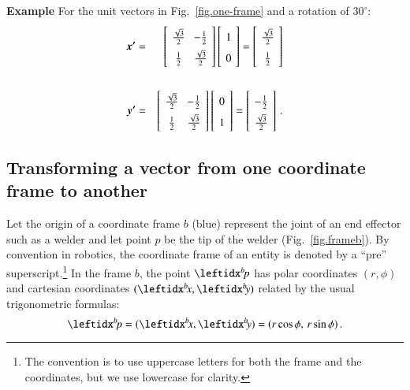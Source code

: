 \noindent\textbf{Example} For the unit vectors in Fig.~\ref{fig.one-frame} and a rotation of $30^\circ$:
\begin{eqnarray*}
\vec{x'}&=&\left[\spacearray\begin{array}{cc}\frac{\sqrt{3}}{2}&-\frac{1}{2}\\\frac{1}{2}&\frac{\sqrt{3}}{2}\end{array}\right]
\left[\spacearray\begin{array}{c}1\\0\end{array}\right]=
\left[\spacearray\begin{array}{c}\frac{\sqrt{3}}{2}\\\frac{1}{2}\end{array}\right]\\
\,\\
\vec{y'}&=&\left[\spacearray\begin{array}{cc}\frac{\sqrt{3}}{2}&-\frac{1}{2}\\\frac{1}{2}&\frac{\sqrt{3}}{2}\end{array}\right]
\left[\spacearray\begin{array}{c}0\\1\end{array}\right]=
\left[\spacearray\begin{array}{c}-\frac{1}{2}\\\frac{\sqrt{3}}{2}\end{array}\right]\,.
\end{eqnarray*}

\subsection{Transforming a vector from one coordinate frame to another}

Let the origin of a coordinate frame $b$ (blue) represent the joint of an end effector such as a welder and let point $p$ be the tip of the welder (Fig.~\ref{fig.frameb}). By convention in robotics, the coordinate frame of an entity is denoted by a ``pre'' superscript.\footnote{The convention is to use uppercase letters for both the frame and the coordinates, but we use lowercase for clarity.}  In the frame $b$, the point $\bp$ has polar coordinates $(r,\phi)$ and cartesian coordinates $(\bx,\by)$ related by the usual trigonometric formulas:
\[
\bp = (\bx,\by) = (r\cos\phi,\, r\sin\phi)\,.
\]

